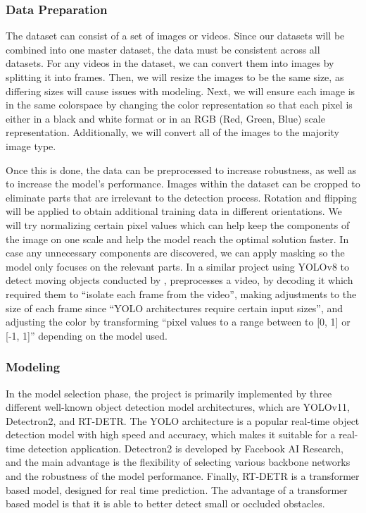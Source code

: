 \documentclass[stu,12pt,floatsintext]{apa7}
\begin{document}
\subsubsection{Data Preparation}
The dataset can consist of a set of images or videos. Since our datasets will be combined into one master dataset, the data must be consistent across all datasets. For any videos in the dataset, we can convert them into images by splitting it into frames. Then, we will resize the images to be the same size, as differing sizes will cause issues with modeling. Next, we will ensure each image is in the same colorspace by changing the color representation so that each pixel is either in a black and white format or in an RGB (Red, Green, Blue) scale representation. Additionally, we will convert all of the images to the majority image type.

Once this is done, the data can be preprocessed to increase robustness, as well as to increase the model's performance.
Images within the dataset can be cropped to eliminate parts that are irrelevant to the detection process. Rotation and flipping will be applied to obtain additional training data in different orientations. We will try normalizing certain pixel values which can help keep the components of the image on one scale and help the model reach the optimal solution faster. In case any unnecessary components are discovered, we can apply masking so the model only focuses on the relevant parts. In a similar project using YOLOv8 to detect moving objects conducted by \textcite{safaldin_improved_2024}, preprocesses a video, by decoding it which required them to ``isolate each frame from the video'', making adjustments to the size of each frame since ``YOLO architectures require certain input sizes'', and adjusting the color by transforming ``pixel values to a range between to [0, 1] or [-1, 1]'' depending on the model used.


\subsubsection{Modeling}

In the model selection phase, the project is primarily implemented by three different well-known object detection model architectures, which are YOLOv11, Detectron2, and RT-DETR. The YOLO architecture is a popular real-time object detection model with high speed and accuracy, which makes it suitable for a real-time detection application. Detectron2 is developed by Facebook AI Research, and the main advantage is the flexibility of selecting various backbone networks and the robustness of the model performance. Finally, RT-DETR is a transformer based model, designed for real time prediction. The advantage of a transformer based model is that it is able to better detect small or occluded obstacles.
\end{document}

